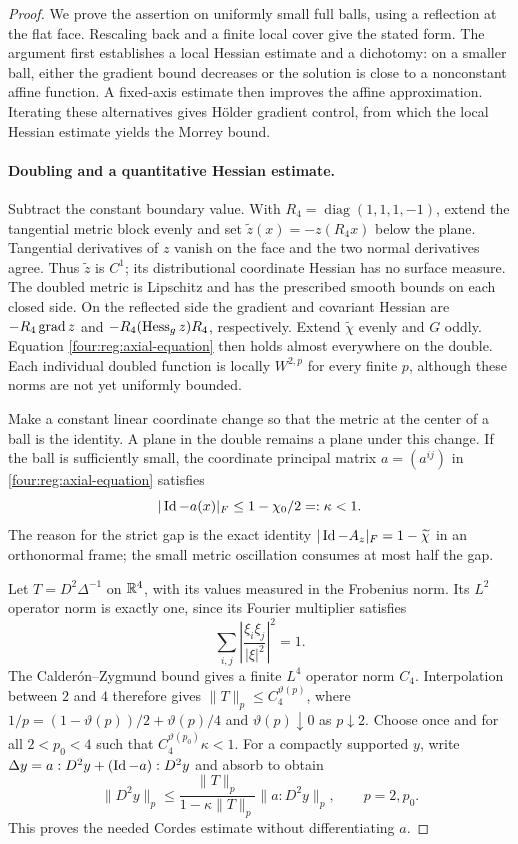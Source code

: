 \begin{proof}
We prove the assertion on uniformly small full balls, using a
reflection at the flat face.  Rescaling back and a finite local
cover give the stated form.
The argument first establishes a local Hessian estimate and a dichotomy:
on a smaller ball, either the gradient bound decreases or the solution
is close to a nonconstant affine function. A fixed-axis estimate then
improves the affine approximation. Iterating these alternatives gives
H\"older gradient control, from which the local Hessian estimate yields
the Morrey bound.

\paragraph{Doubling and a quantitative Hessian estimate.}
Subtract the constant boundary value.  With
$R_4=\operatorname{diag}(1,1,1,-1)$, extend the tangential metric
block evenly and set $\widetilde z(x)=-z(R_4x)$ below the plane.
Tangential derivatives of $z$ vanish on the face and the two normal
derivatives agree.  Thus $\widetilde z$ is $C^1$; its distributional
coordinate Hessian has no surface measure.  The doubled metric is
Lipschitz and has the prescribed smooth bounds on each closed side.
On the reflected side the gradient and covariant Hessian are
$-R_4\operatorname{grad} z$ and $-R_4(\operatorname{Hess}_g z)R_4$, respectively.  Extend
$\widetilde\chi$ evenly and $G$ oddly.  Equation
\eqref{four:reg:axial-equation} then holds almost everywhere on the double.
Each individual doubled function is locally $W^{2,p}$ for every
finite $p$, although these norms are not yet uniformly bounded.

Make a constant linear coordinate change so that the metric at the
center of a ball is the identity.  A plane in the double remains a
plane under this change.  If the ball is sufficiently small, the
coordinate principal matrix $a=(a^{ij})$ in
\eqref{four:reg:axial-equation} satisfies
\begin{equation}\label{four:reg:defect}
 |\operatorname{Id}-a(x)|_F\le 1-\chi_0/2=:\kappa<1.
\end{equation}
The reason for the strict gap is the exact identity
$|\operatorname{Id}-A_z|_F=1-\widetilde\chi$ in an orthonormal frame;
the small metric oscillation consumes at most half the gap.

Let $T=D^2\Delta^{-1}$ on $\mathbb R^4$, with its values measured in the
Frobenius norm.  Its $L^2$ operator norm is exactly one, since its
Fourier multiplier satisfies
\[
 \sum_{i,j}\left|\frac{\xi_i\xi_j}{|\xi|^2}\right|^2=1.
\]
The Calder\'on--Zygmund bound gives a finite $L^4$ operator norm
$C_4$.  Interpolation between $2$ and $4$ therefore gives
$\|T\|_{p}\le C_4^{\vartheta(p)}$, where
$1/p=(1-\vartheta(p))/2+\vartheta(p)/4$ and
$\vartheta(p)\downarrow0$ as $p\downarrow2$.  Choose once and for
all $2<p_0<4$ such that $C_4^{\vartheta(p_0)}\kappa<1$.
For a compactly supported $y$, write
$\Delta y=a:D^2y+(\operatorname{Id}-a):D^2y$ and absorb to obtain
\[
 \|D^2y\|_{p}\le
 \frac{\|T\|_p}{1-\kappa\|T\|_p}\|a:D^2y\|_p,
 \qquad p=2,p_0.
\]
This proves the needed Cordes estimate without differentiating $a$.


\end{proof}
